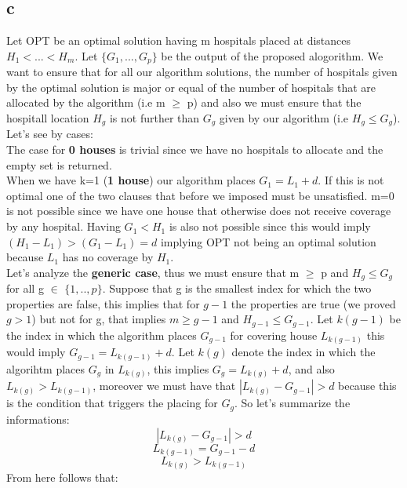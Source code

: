 \documentclass{article}
\begin{document}
\subsection{c}
Let OPT be an optimal solution having m hospitals placed at distances $H_{1}<...<H_{m}$. Let $\{ G_{1},...,G_{p} \}$ be the output of the proposed alogorithm. We want to ensure that for all our algorithm solutions, the number of hospitals given by the optimal solution is major or equal of the number of hospitals that are allocated by the algorithm (i.e m $\ge$ p) and also we must ensure that the hospitall location $H_{g}$ is not further than $G_{g}$ given by our algorithm (i.e $H_{g} \le G_{g} $). Let's see by cases:\\
The case for \textbf{0 houses} is trivial since we have no hospitals to allocate and the empty set is returned.\\
When we have k=1 (\textbf{1 house}) our algorithm places $G_{1}=L_{1}+d$. If this is not optimal one of the two clauses that before we imposed must be unsatisfied. m=0 is not possible since we have one house that otherwise does not receive coverage by any hospital. Having $G_{1} < H_{1}$ is also not possible since this would imply $(H_{1}-L_{1}) > (G_{1}-L_{1})=d$ implying OPT not being an optimal solution because $L_{1}$ has no coverage by $H_{1}$. \\
Let's analyze the \textbf{generic case}, thus we must ensure that m $\ge$ p and $H_{g}\le G_{g} $ for all g $\in$ $\{ 1,..,p \}$. Suppose that g is the smallest index for which the two properties are false, this implies that for $g-1$ the properties are true (we proved $g>1$) but not for g, that implies $m \ge g-1$ and $H_{g-1} \le G_{g-1}$. Let $k(g-1)$ be the index in which the algorithm places $G_{g-1}$ for covering house $L_{k(g-1)}$ this would imply $G_{g-1}=L_{k(g-1)}+d$. Let $k(g)$ denote the index in which the algorihtm places $G_{g}$ in $L_{k(g)}$, this implies $G_{g}=L_{k(g)}+d$, and also $L_{k(g)} > L_{k(g-1)}$, moreover we must have that $ |L_{k(g)}-G_{g-1}| > d $ because this is the condition that triggers the placing for $G_{g}$. So let's summarize the informations:
\begin{equation}
|L_{k(g)}-G_{g-1}| > d
\end{equation}
\begin{equation}
L_{k(g-1)}=G_{g-1}-d
\end{equation}
\begin{equation}
L_{k(g)}>L_{k(g-1)}
\end{equation}
From here follows that:
\end{document}
